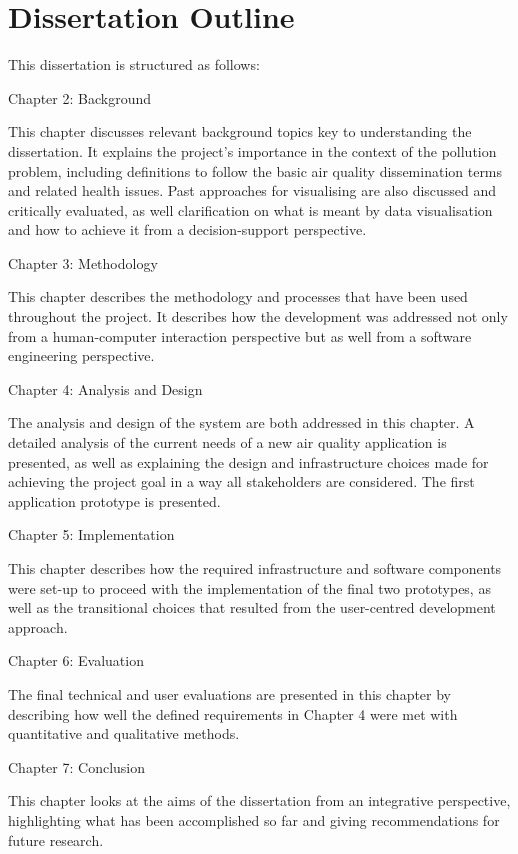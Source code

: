 \section{Dissertation Outline}
This dissertation is structured as follows: 
 
\bigskip
 Chapter 2: Background
\bigskip

This chapter discusses relevant background topics key to understanding the dissertation. It explains the project's importance in the context of the pollution problem, including definitions to follow the basic air quality dissemination terms and related health issues. Past approaches for visualising are also discussed and critically evaluated, as well clarification on what is meant by data visualisation and how to achieve it from a decision-support perspective.
 
\bigskip
 Chapter 3: Methodology
\bigskip
  
This chapter describes the methodology and processes that have been used throughout the project. It describes how the development was addressed not only from a human-computer interaction perspective but as well from a software engineering perspective. 
  
\bigskip  
 Chapter 4: Analysis and Design
\bigskip

The analysis and design of the system are  both addressed in this chapter. A detailed analysis of the current needs of a new air quality application is presented, as well as explaining the design and infrastructure choices made for achieving the project goal in a way all stakeholders are considered. The first application prototype is presented.
 
\bigskip
Chapter 5: Implementation
\bigskip

This chapter describes how the required infrastructure and software components were set-up to proceed with the implementation of the final two prototypes, as well as the transitional choices that resulted from the user-centred development approach.

\bigskip
 Chapter 6: Evaluation
\bigskip

The final technical and user evaluations are presented in this chapter by describing how well the defined requirements in Chapter 4 were met with quantitative and qualitative methods.

\bigskip
 Chapter 7: Conclusion
\bigskip

This chapter looks at the aims of the dissertation from an integrative perspective, highlighting what has been accomplished so far and giving recommendations for future research.